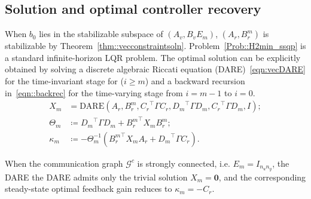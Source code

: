 \subsection{Solution and optimal controller recovery}
When \(b_0\) lies in the stabilizable subspace of \((A_v,B_v E_m)\), \((A_r, B_r^m)\) is stabilizable by Theorem~\ref{thm::vecconstraintsoln}.
Problem~\ref{Prob::H2min_ssqp} is a standard infinite-horizon LQR problem. The optimal solution can be explicitly obtained by solving a discrete algebraic Riccati equation (DARE)~\eqref{eqn:vecDARE} for the time-invariant stage for (\(i \geq m\)) and a backward recursion in~\eqref{eqn::backrec} for the time-varying stage from \(i = m - 1\) to \(i = 0\).
\begin{subequations}\label{eqn:vecDARE}
\begin{align}
    X_m &= \mathrm{DARE}(A_r, B_r^m, {C_r}^\top \Gamma {C_r}, {D_m}^\top\Gamma D_m,{C_r}^\top \Gamma {D_m},I);\\
    \Theta_m & \coloneqq {D_{m}}^\top\Gamma D_m + {B_r^m}^\top X_{m}{B_r^m}; \\
    \kappa_m & \coloneqq -\Theta_m^{-1} ({B_r^m}^\top X_{m} A_r +{D_{m}}^\top\Gamma C_r).
\end{align}
\end{subequations}
\begin{rem}
When the communication graph \(\mathcal{G}^c\) is strongly connected, i.e. \(E_m = I_{n_u n_y}\), the DARE the DARE admits only the trivial solution \(X_m = \mathbf{0}\), and the corresponding steady-state optimal feedback gain reduces to \(\kappa_m = -C_r\).
\end{rem}


